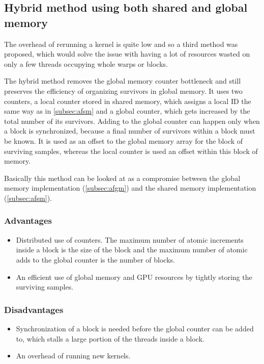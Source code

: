 \subsection{Hybrid method using both shared and global memory}\label{subsec:hybrid}

The overhead of rerunning a kernel is quite low and so a third method was proposed, which would solve the issue with having a lot of resources wasted on only a few threads occupying whole warps or blocks.

The hybrid method removes the global memory counter bottleneck and still preserves the efficiency of organizing survivors in global memory. It uses two counters, a local counter stored in shared memory, which assigns a local ID the same way as in \ref{subsec:afsm} and a global counter, which gets increased by the total number of its survivors. Adding to the global counter can happen only when a block is synchronized, because a final number of survivors within a block must be known. It is used as an offset to the global memory array for the block of surviving samples, whereas the local counter is used an offset within this block of memory.

Basically this method can be looked at as a compromise between the global memory implementation (\ref{subsec:afgm}) and the shared memory implementation (\ref{subsec:afsm}).

\subsubsection{Advantages}

\begin{itemize}
	\item Distributed use of counters. The maximum number of atomic increments inside a block is the size of the block and the maximum number of atomic adds to the global counter is the number of blocks.
	\item An efficient use of global memory and GPU resources by tightly storing the surviving samples.
\end{itemize}

\subsubsection{Disadvantages}

\begin{itemize}
	\item Synchronization of a block is needed before the global counter can be added to, which stalls a large portion of the threads inside a block.
	\item An overhead of running new kernels.
\end{itemize}

